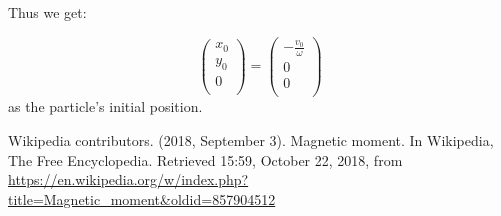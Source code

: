 \documentclass[a4paper,12pt,twoside]{article}
\begin{document}
	Thus we get:

\begin{equation*}
	\begin{pmatrix} x_0\\ y_0\\ 0\\ \end{pmatrix} = \begin{pmatrix} -\frac{v_0}{\omega}\\ 0\\ 0\\ \end{pmatrix}
\end{equation*}
as the particle's initial position.


\begin{thebibliography}{99}
	Wikipedia contributors. (2018, September 3). Magnetic moment. In Wikipedia, The Free Encyclopedia. Retrieved 15:59, October 22, 2018, from \url{https://en.wikipedia.org/w/index.php?title=Magnetic_moment&oldid=857904512}
\end{thebibliography}
\end{document}
